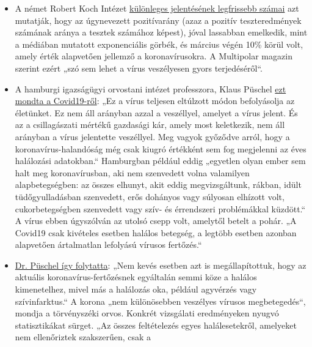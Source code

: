 \begin{itemize}
\tightlist
\item
  A német Robert Koch Intézet
  \href{https://multipolar-magazin.de/artikel/coronavirus-regierung-ignoriert-daten}{különleges
  jelentésének legfrissebb számai} azt mutatják, hogy az úgynevezett
  pozitívarány (azaz a pozitív teszteredmények számának aránya a tesztek
  számához képest), jóval lassabban emelkedik, mint a médiában mutatott
  exponenciális görbék, és március végén 10\% körül volt, amely érték
  alapvetően jellemző a koronavírusokra. A Multipolar magazin szerint
  ezért „szó sem lehet a vírus veszélyesen gyors terjedéséről``.
\item
  A hamburgi igazságügyi orvostani intézet professzora, Klaus Püschel
  \href{https://www.pressreader.com/germany/hamburger-morgenpost/20200403/281487868456736}{ezt
  mondta a Covid19-ről}: „Ez a vírus teljesen eltúlzott módon
  befolyásolja az életünket. Ez nem áll arányban azzal a veszéllyel,
  amelyet a vírus jelent. És az a csillagászati mértékű gazdasági kár,
  amely most keletkezik, nem áll arányban a vírus jelentette veszéllyel.
  Meg vagyok győződve arról, hogy a koronavírus-halandóság még csak
  kiugró értékként sem fog megjelenni az éves halálozási adatokban.``
  Hamburgban például eddig „egyetlen olyan ember sem halt meg
  koronavírusban, aki nem szenvedett volna valamilyen alapbetegségben:
  az összes elhunyt, akit eddig megvizsgáltunk, rákban, idült
  tüdőgyulladásban szenvedett, erős dohányos vagy súlyosan elhízott
  volt, cukorbetegségben szenvedett vagy szív- és érrendszeri
  problémákkal küzdött.`` A vírus ebben úgyszólván az utolsó csepp volt,
  amelytől betelt a pohár. „A Covid19 csak kivételes esetben halálos
  betegség, a legtöbb esetben azonban alapvetően ártalmatlan lefolyású
  vírusos fertőzés.``
\item
  \href{https://www.abendblatt.de/hamburg/article228828787/rechtsmedizin-pueschel-hamburg-corona-virus-infektion-covid-19-coronavirus-krise-patienten-krankenhaeuser-kliniken-infektionsrate-krankheit-pandemie-test-lungenkrankheit-sars-cov-epidemie-sars-cov-2.html}{Dr.
  Püschel így folytatta}: „Nem kevés esetben azt is megállapítottuk,
  hogy az aktuális koronavírus-fertőzésnek egyáltalán semmi köze a
  halálos kimenetelhez, mivel más a halálozás oka, például agyvérzés
  vagy szívinfarktus.`` A korona „nem különösebben veszélyes vírusos
  megbetegedés``, mondja a törvényszéki orvos. Konkrét vizsgálati
  eredményeken nyugvó statisztikákat sürget. „Az összes feltételezés
  egyes halálesetekről, amelyeket nem ellenőriztek szakszerűen, csak a

\end{itemize}
